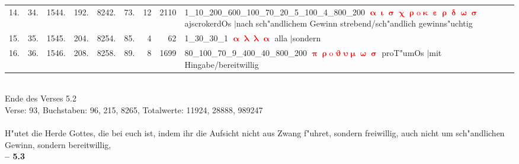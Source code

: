 \documentclass[a4paper,10pt,landscape]{article}
\begin{document}
\begin{tabular}{rrrrrrrrp{120mm}}
14.&34.&1544.&192.&8242.&73.&12&2110&1\_10\_200\_600\_100\_70\_20\_5\_100\_4\_800\_200 \textcolor{red}{$\boldsymbol{\upalpha\upiota\upsigma\upchi\uprho\mathrm{o}\upkappa\upepsilon\uprho\updelta\upomega\upsigma}$} ajscrokerdOs $|$nach sch"andlichem Gewinn strebend/sch"andlich gewinns"uchtig\\
15.&35.&1545.&204.&8254.&85.&4&62&1\_30\_30\_1 \textcolor{red}{$\boldsymbol{\upalpha\uplambda\uplambda\upalpha}$} alla $|$sondern\\
16.&36.&1546.&208.&8258.&89.&8&1699&80\_100\_70\_9\_400\_40\_800\_200 \textcolor{red}{$\boldsymbol{\uppi\uprho\mathrm{o}\upvartheta\upsilon\upmu\upomega\upsigma}$} proT"umOs $|$mit Hingabe/bereitwillig\\
\end{tabular}\medskip \\
Ende des Verses 5.2\\
Verse: 93, Buchstaben: 96, 215, 8265, Totalwerte: 11924, 28888, 989247\\
\\
H"utet die Herde Gottes, die bei euch ist, indem ihr die Aufsicht nicht aus Zwang f"uhret, sondern freiwillig, auch nicht um sch"andlichen Gewinn, sondern bereitwillig,\\
\newpage 
{\bf -- 5.3}\\
\medskip \\
\end{document}
